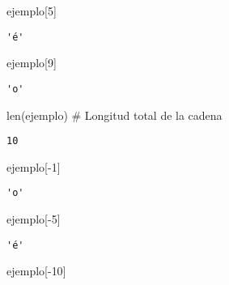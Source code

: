\documentclass[
  letterpaper,
  DIV=11,
  numbers=noendperiod]{scrreprt}
\newenvironment{Shaded}{\begin{snugshade}}{\end{snugshade}}
\newcommand{\BuiltInTok}[1]{\textcolor[rgb]{0.00,0.23,0.31}{#1}}
\newcommand{\CommentTok}[1]{\textcolor[rgb]{0.37,0.37,0.37}{#1}}
\newcommand{\DecValTok}[1]{\textcolor[rgb]{0.68,0.00,0.00}{#1}}
\newcommand{\NormalTok}[1]{\textcolor[rgb]{0.00,0.23,0.31}{#1}}
\newcommand{\OperatorTok}[1]{\textcolor[rgb]{0.37,0.37,0.37}{#1}}
\begin{document}
\begin{Shaded}
\begin{Highlighting}[]
\NormalTok{ejemplo[}\DecValTok{5}\NormalTok{]}
\end{Highlighting}
\end{Shaded}

\begin{verbatim}
'é'
\end{verbatim}

\begin{Shaded}
\begin{Highlighting}[]
\NormalTok{ejemplo[}\DecValTok{9}\NormalTok{]}
\end{Highlighting}
\end{Shaded}

\begin{verbatim}
'o'
\end{verbatim}

\begin{Shaded}
\begin{Highlighting}[]
\BuiltInTok{len}\NormalTok{(ejemplo) }\CommentTok{\# Longitud total de la cadena}
\end{Highlighting}
\end{Shaded}

\begin{verbatim}
10
\end{verbatim}

\begin{Shaded}
\begin{Highlighting}[]
\NormalTok{ejemplo[}\OperatorTok{{-}}\DecValTok{1}\NormalTok{]}
\end{Highlighting}
\end{Shaded}

\begin{verbatim}
'o'
\end{verbatim}

\begin{Shaded}
\begin{Highlighting}[]
\NormalTok{ejemplo[}\OperatorTok{{-}}\DecValTok{5}\NormalTok{]}
\end{Highlighting}
\end{Shaded}

\begin{verbatim}
'é'
\end{verbatim}

\begin{Shaded}
\begin{Highlighting}[]
\NormalTok{ejemplo[}\OperatorTok{{-}}\DecValTok{10}\NormalTok{]}
\end{Highlighting}
\end{Shaded}
\end{document}
